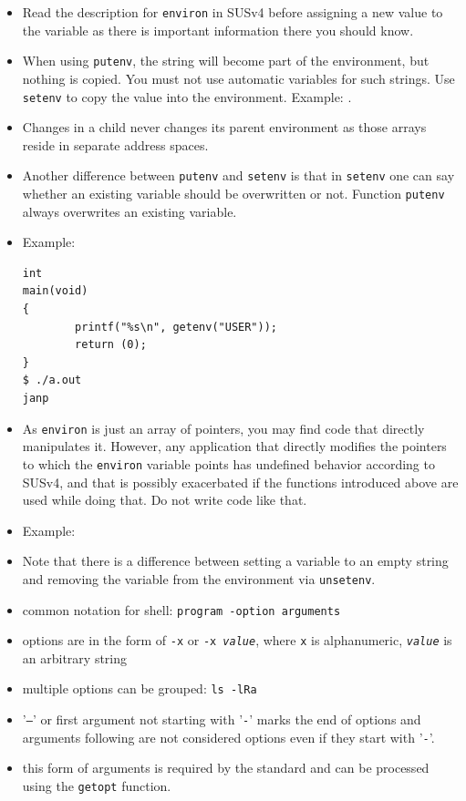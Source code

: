 \begin{itemize}
\item Read the description for \texttt{environ} in SUSv4 before assigning a new
value to the variable as there is important information there you should know.
\item When using \texttt{putenv}, the string will become part of the
environment, but nothing is copied.  You must not use automatic variables for such
strings.  Use \texttt{setenv} to copy the value into the environment.  Example:
.
\item Changes in a child never changes its parent environment as those arrays
reside in separate address spaces.
\item Another difference between \texttt{putenv} and \texttt{setenv} is that in
\texttt{setenv} one can say whether an existing variable should be overwritten
or not. Function \texttt{putenv} always overwrites an existing variable.
\item Example:

\begin{verbatim}
int
main(void)
{
        printf("%s\n", getenv("USER"));
        return (0);
}
$ ./a.out 
janp
\end{verbatim}

\item As \texttt{environ} is just an array of pointers, you may find code that
directly manipulates it.  However, any application that directly modifies the
pointers to which the \texttt{environ} variable points has undefined behavior according
to SUSv4, and that is possibly exacerbated if the functions introduced above are
used while doing that.  Do not write code like that.
\item Example: 
\item Note that there is a difference between setting a variable to an empty
string and removing the variable from the environment via \texttt{unsetenv}.
\end{itemize}


\begin{slide}
\begin{itemize}
\item common notation for shell: \verb#program -option arguments#
\item options are in the form of \texttt{-x} or \texttt{-x \emph{value}},
where \texttt{x} is alphanumeric, \texttt{\emph{value}} is an arbitrary string
\item multiple options can be grouped: \texttt{ls -lRa}
\item '\texttt{--}' or first argument not starting with '\texttt{-}'
marks the end of options and arguments following are not considered options even
if they start with '\texttt{-}'.
\item this form of arguments is required by the standard and can be processed
using the \texttt{getopt} function.
\end{itemize}
\end{slide}

